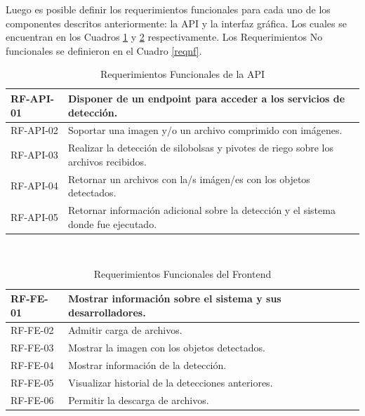 \newpage
Luego es posible definir los requerimientos funcionales para cada uno de los componentes descritos anteriormente: la API y la interfaz gráfica. Los cuales se encuentran en los Cuadros \ref{reqapi} y \ref{reqfend} respectivamente. Los Requerimientos No funcionales se definieron en el Cuadro \ref{reqnf}.

\begin{table}[h!]
    \begin{tabular}{ | p{2cm} |p{10cm}| }
        \hline
        \rowcolor[HTML]{d6d8ff}
        RF-API-01 & Disponer de un endpoint para acceder a los servicios de detección.\\
        \hline
        RF-API-02 & Soportar una imagen y/o un archivo comprimido con imágenes.\\
        \hline
        \rowcolor[HTML]{d6d8ff}
         RF-API-03 & Realizar la detección de silobolsas y pivotes de riego sobre los archivos recibidos.\\
        \hline
         RF-API-04 & Retornar un archivos con la/s imágen/es con los objetos detectados.\\
        \hline
        \rowcolor[HTML]{d6d8ff}
         RF-API-05 & Retornar información adicional sobre la detección y el sistema donde fue ejecutado.\\
        \hline
    \end{tabular}\\
    \caption{Requerimientos Funcionales de la API}
    \label{reqapi}
\end{table}

\begin{table}[h!]
    \begin{tabular}{ | p{2cm} |p{10cm}| }
        \hline
        \rowcolor[HTML]{d6d8ff}
        RF-FE-01 & Mostrar información sobre el sistema y sus desarrolladores.\\
        \hline
        RF-FE-02 & Admitir carga de archivos.\\
        \hline
        \rowcolor[HTML]{d6d8ff}
        RF-FE-03 & Mostrar la imagen con los objetos detectados.\\
        \hline
        RF-FE-04 & Mostrar información de la detección.\\
        \hline
        \rowcolor[HTML]{d6d8ff}
        RF-FE-05 & Visualizar historial de la detecciones anteriores.\\
        \hline
        RF-FE-06 & Permitir la descarga de archivos.\\
        \hline
    \end{tabular}\\
    \caption{Requerimientos Funcionales del Frontend}
    \label{reqfend}
\end{table}


